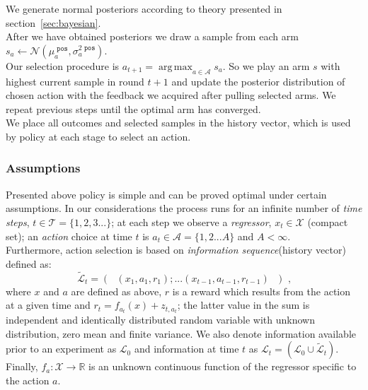 \documentclass[12pt, a4paper, pdflatex, leqno, twoside]{report}
\begin{document}
\noindent We generate normal posteriors according to theory presented in 
section~\ref{sec:bayesian}.\\

\noindent After we have obtained posteriors we draw a sample from each arm $\mathit{s}_a 
\leftarrow \mathcal{N}(\mu_a^{\texttt{ pos}}, \sigma^{2\texttt{ pos}}_a)$.\\

\noindent Our selection procedure is $\mathit{a}_{t+1} = \operatorname{arg\,max}_{a \in 
\mathscr{A}} \mathit{s}_a$. So we play an arm $s$ with highest current sample in round $t+1$ and update the posterior distribution of chosen action with the feedback we acquired after pulling selected arms. We repeat 
previous steps until the optimal arm has converged.\\ 
We place all outcomes and selected samples in the history vector, which is used by policy at each stage to select an action.\\


\subsubsection{Assumptions}
Presented above policy is simple and can be proved optimal under certain assumptions. In our considerations the process runs for an infinite number of \emph{time 
steps}, $t \in \mathscr{T} = \{ 1,2,3... \}$; at each step we observe a
\emph{regressor}, $x_t \in \mathscr{X}$ (compact set); an \emph{action} choice 
at time $t$ is $a_t \in \mathscr{A} = \{ 1,2...A \}$ and $A<\infty$.\\
Furthermore, action selection is based on \emph{information sequence}(history 
vector) defined as:
$$
  \tilde{\mathscr{L}}_t = \left( \text{  } (x_1,a_1,r_1);...(x_{t-1},a_{t-
1},r_{t-1}) \text{  } \right) \text{ ,}
$$
where $x$ and $a$ are defined as above, $r$ is a reward which results from the
action at a given time and $r_t = f_{a_t}(x) + z_{t,a_t}$; the latter value in the 
sum is independent and identically distributed random 
variable with unknown distribution, zero mean and finite variance. We also 
denote information available prior to an experiment as $\mathscr{L}_0$ and 
information at time $t$ as $\mathscr{L}_t = \left( \mathscr{L}_0 \cup 
\tilde{\mathscr{L}}_t \right)$.\\
Finally, $f_a : \mathscr{X} \rightarrow \mathbb{R}$ is an unknown continuous 
function of the regressor specific to the action $a$.\\
\end{document}
